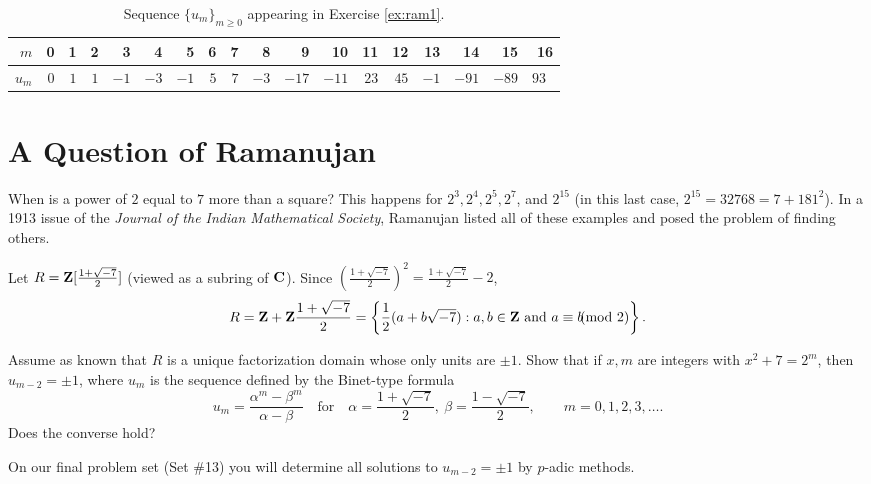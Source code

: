 \begin{table}[t]
    \centering\setlength\tabcolsep{3.7pt}
    \begin{tabular}{r||r r r r r r r r r r r r r r r r r}       $m$  & 0 &  1&  2 &  3 & 4 & 5 & 6 & 7 & 8 & 9 & 10 & 11 & 12 & 13 & 14 & 15 & 16\\\midrule       $u_m$  & $0$ & $1$ & $1$ & $-1$ & $-3$ & $-1$ & $5$ & $7$ & $-3$ & $-17$ & $-11$ & $23$ & $45$ & $-1$ & $-91$ & $-89$ & $93$\
    \end{tabular}
    \caption*{Sequence $\{u_m\}_{m\ge 0}$ appearing in Exercise \ref{ex:ram1}.}
\end{table}

\section*{A Question of Ramanujan}
When is a power of $2$ equal to $7$ more than a square? This happens for $2^3, 2^4, 2^5, 2^7$, and $2^{15}$ (in this last case, $2^{15} = \num{32768} = 7 + 181^2$). In a 1913 issue of the \emph{Journal of the Indian Mathematical Society}, Ramanujan listed all of these examples and posed the problem of finding others.

Let $R=\mathbf{Z}[\frac{1+\sqrt{-7}}{2}]$ (viewed as a subring of $\mathbf{C}$). Since $(\frac{1+\sqrt{-7}}{2})^2 = \frac{1+\sqrt{-7}}{2} - 2$,
\[ R = \mathbf{Z} + \mathbf{Z} \frac{1+\sqrt{-7}}{2} =  \left\{\frac{1}{2}(a+b\sqrt{-7}):a,b \in \mathbf{Z} \text{ and }a\equiv b\!\!\!\!\pmod{2}\right\}. \]


\begin{prob}[Nagell]\label{ex:ram1}\label{prob:40} Assume as known that $R$ is a unique factorization domain whose only units are $\pm 1$. Show that if $x,m$ are integers with $x^2+7 = 2^m$, then $u_{m-2} = \pm 1$, where $u_m$ is the  sequence defined by the Binet-type formula
\[ u_m = \frac{\alpha^m-\beta^m}{\alpha-\beta} \quad\text{for}\quad \alpha = \frac{1+\sqrt{-7}}{2},\ \beta = \frac{1-\sqrt{-7}}{2}, \qquad m=0,1,2,3,\dots. \]
Does the converse hold?
\end{prob}

{\scriptsize On our final problem set (Set \#13) you will determine all solutions to $u_{m-2}=\pm 1$ by $p$-adic methods.}







%
